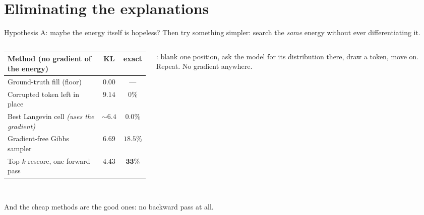 \documentclass{beamer}
\begin{document}
\section{Eliminating the explanations}

\begin{frame}{Hypothesis A: maybe the energy itself is hopeless?}
  \vspace{0.2em}
  {\small Then try something simpler: search the \emph{same} energy without ever differentiating it.}
  \vspace{0.5em}
  \begin{columns}[T]
    \begin{column}{0.63\textwidth}
      \scriptsize
      \begin{tabular}{lcc}
        \toprule
        Method (no gradient of the energy) & KL & exact \\
        \midrule
        Ground-truth fill (floor) & $0.00$ & --- \\
        Corrupted token left in place & $9.14$ & $0\%$ \\
        Best Langevin cell \emph{(uses the gradient)} & $\sim6.4$ & $0.0\%$ \\
        Gradient-free Gibbs sampler & $6.69$ & $18.5\%$ \\
        Top-$k$ rescore, one forward pass & $\mathbf{4.43}$ & $\mathbf{33\%}$ \\
        \bottomrule
      \end{tabular}
    \end{column}
    \begin{column}{0.37\textwidth}
      \begin{block}{}
      \scriptsize {}: blank one position, ask the model for its distribution
      there, draw a token, move on. Repeat. No gradient anywhere.
      \end{block}
    \end{column}
  \end{columns}
  \vspace{0.6em}
  \begin{center}
  \\
  {\footnotesize And the cheap methods are the good ones: no backward pass at all.}
  \end{center}
\end{frame}
\end{document}

